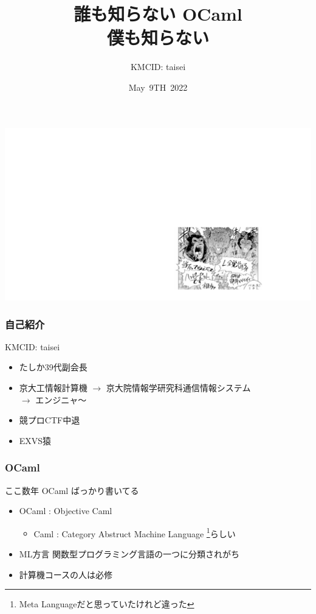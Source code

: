 \documentclass[dvipdfmx,14pt,notheorems,aspectratio=169]{beamer}
\title[]{誰も知らない OCaml\\{\small 僕も知らない}}%
\author[]{\large KMCID: taisei}%
\date{\large May\ 9TH\ 2022}%
\theoremstyle{definition}
\begin{document}
    
    {
    }
    \begin{frame}
    \titlepage %
    \end{frame}
    {
    
    }

    {
        \begin{centering}
            \includegraphics[width=\paperwidth]{chimpanzee.png}
        \end{centering}
    }
    \begin{frame}[fragile]\frametitle{自己紹介}
        KMCID: taisei
        \begin{itemize}
            \item たしか39代副会長
            \item 京大工情報計算機 $\rightarrow$ 京大院情報学研究科通信情報システム \\
            $\rightarrow$ エンジニャ〜
            \item 競プロCTF中退
            \item EXVS猿
        \end{itemize}
    \end{frame}
    {}

    \begin{frame}[fragile]\frametitle{OCaml}
        ここ数年 OCaml ばっかり書いてる
        \begin{itemize}
            \item OCaml : Objective Caml
            \begin{itemize}
                \item Caml : Category Abstruct Machine Language \footnote{Meta Languageだと思っていたけれど違った}らしい
            \end{itemize}
            \item ML方言 関数型プログラミング言語の一つに分類されがち
            \item 計算機コースの人は必修
        \end{itemize}
    \end{frame}
\end{document}
